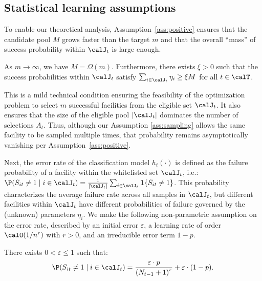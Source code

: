 \documentclass[blindrev]{informs3noheader}
\begin{document}
\subsection{Statistical learning assumptions}
\label{subsec:statistical_learning}
To enable our theoretical analysis, Assumption~\ref{ass:positive} ensures that the candidate pool $M$ grows faster than the target $m$ and that the overall “mass” of success probability within $\calJ_t$ is large enough.
\begin{assumption}[Feasibility]\label{ass:positive}
    As $m \to \infty$, we have $M=\Omega(m)$. Furthermore, there exists $\xi>0$ such that the success probabilities within $\calJ_t$ satisfy $\sum_{i \in \calJ_t}\eta_i\geq \xi M$ for all $t\in\calT$.
\end{assumption}

This is a mild technical condition ensuring the feasibility of the optimization problem to select $m$ successful facilities from the eligible set $\calJ_t$. It also ensures that the size of the eligible pool $|\calJ_t|$ dominates the number of selections $A_t$. Thus, although our Assumption \ref{ass:sampling} allows the same facility to be sampled multiple times, that probability remains asymptotically vanishing per Assumption~\ref{ass:positive}.

Next, the error rate of the classification model $h_t(\cdot)$ is defined as the failure probability of a facility within the whitelisted set $\calJ_t$, i.e.: $\P(S_{it} \neq 1\mid i \in \calJ_t)=\frac{1}{|\calJ_t|} \sum_{i \in \calJ_t} \mathbf{1}\{S_{it}\neq 1\}$. This probability characterizes the average failure rate across all samples in $\calJ_t$, but different facilities within $\calJ_t$ have different probabilities of failure governed by the (unknown) parameters $\eta_i$. We make the following non-parametric assumption on the error rate, described by an initial error $\varepsilon$, a learning rate of order $\calO(1/n^{r})$ with $r>0$, and an irreducible error term $1-p$.
\begin{assumption} \label{ass:classification}
    There exists $0<\varepsilon\leq 1$ such that:
    \begin{align*}
        \P(S_{it}\neq1 \mid i \in \calJ_t)=\frac{\varepsilon\cdot p}{\left(N_{t-1} + 1\right)^r}+\varepsilon\cdot(1-p).
    \end{align*}
\end{assumption}
\end{document}

